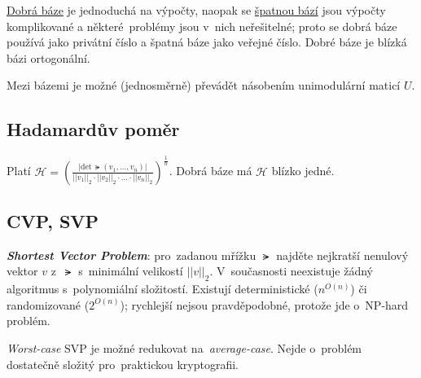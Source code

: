 \underline{Dobrá báze} je jednoduchá na výpočty, naopak se \underline{špatnou bází} jsou výpočty komplikované a některé~problémy jsou v~nich neřešitelné; proto se dobrá báze používá jako privátní číslo a špatná báze jako veřejné číslo.
Dobré báze je blízká bázi ortogonální.

Mezi bázemi je možné (jednosměrně) převádět násobením unimodulární\footnotemark{} maticí $U$.

\subsection{Hadamardův poměr}

Platí
$
\mathcal{H} =
\left( \frac{
| \text{det} \, \lat(v_1, \dots, v_n) | }{
|| v_1 ||_2 \cdot || v_2 ||_2 \cdot \dots \cdot ||v_n||_2
} \right)^{\frac{1}{n}}
$.
Dobrá báze má $\mathcal{H}$ blízko jedné.



\subsection{CVP, SVP}

\textbf{\emph{Shortest Vector Problem}}: pro~zadanou mřížku $\lat$ najděte nejkratší nenulový vektor $v$ z~$\lat$ s~minimální velikostí $||v||_2$.
V~současnosti neexistuje žádný algoritmus s~polynomiální složitostí.
Existují deterministické ($n^{O(n)}$)\footnotemark{} či randomizované ($2^{O(n)}$)\footnotemark{}; rychlejší nejsou pravděpodobné, protože jde o~NP-hard problém.

\emph{Worst-case} SVP je možné redukovat na~\emph{average-case}\footnotemark{}.
Nejde o~problém dostatečně složitý pro~praktickou kryptografii.

